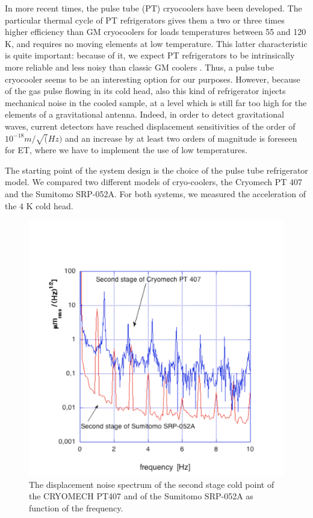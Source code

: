 In more recent times,  the pulse tube (PT) cryocoolers  have been developed. 
The particular thermal cycle of PT refrigerators gives them a  two or three  times higher efficiency than GM cryocoolers for loads temperatures between 55 and 120 K, and requires no moving elements at low temperature. This latter characteristic is quite important: because of it, we expect PT refrigerators to be intrinsically more reliable and less noisy than classic GM coolers  \cite{japanoise}. 
Thus, a pulse tube cryocooler seems to be an interesting option for our purposes. However,  because of the gas pulse flowing in its cold head, also this kind of refrigerator injects mechanical noise in the cooled sample, at a level which is still far too high for the elements of a gravitational antenna. Indeed, in order to detect gravitational waves, current detectors have reached displacement 
sensitivities of the order of $10^{-18} m/\sqrt(Hz)$ and an increase by at least two orders of magnitude  is foreseen for ET, where we have to implement the use of low temperatures.

 
 The starting point of the system design is the choice of the pulse tube refrigerator model.
We compared two different models of cryo-coolers, the Cryomech PT 407 and the Sumitomo SRP-052A. For both systems, we measured the acceleration of the $4$ K cold head.

\begin{figure}[t!]
	\begin{center}
		 \includegraphics[width=12cm]{./Sec_SiteInfra/Figures/Sumitomo_Cryomech.pdf}
		\caption{The displacement noise spectrum of the second stage cold point of the CRYOMECH PT407 and of the Sumitomo SRP-052A as function of the frequency.}
		\label{fig:sumitomo_cryomech}
	\end{center}
\end{figure}



